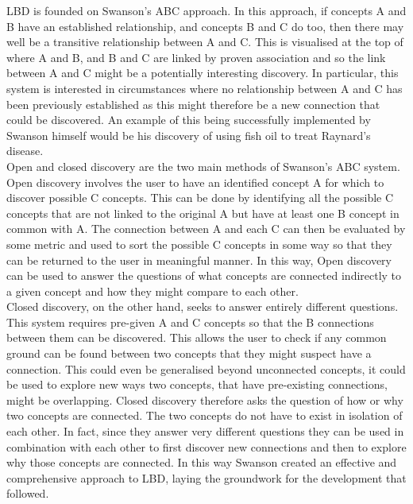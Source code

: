 \documentclass{l4proj}
\begin{document}
LBD is founded on Swanson's ABC approach. In this approach, if concepts A and B have an established relationship, and concepts B and C do too, then there may well be a transitive relationship between A and C. This is visualised at the top of  where A and B, and B and C are linked by proven association and so the link between A and C might be a potentially interesting discovery. In particular, this system is interested in circumstances where no relationship between A and C has been previously established as this might therefore be a new connection that could be discovered. An example of this being successfully implemented by Swanson himself would be his discovery of using fish oil to treat Raynard's disease. \\

Open and closed discovery are the two main methods of Swanson's ABC system. Open discovery involves the user to have an identified concept A for which to discover possible C concepts. This can be done by identifying all the possible C concepts that are not linked to the original A but have at least one B concept in common with A. The connection between A and each C can then be evaluated by some metric and used to sort the possible C concepts in some way so that they can be returned to the user in meaningful manner. In this way, Open discovery can be used to answer the questions of what concepts are connected indirectly to a given concept and how they might compare to each other. \\

Closed discovery, on the other hand, seeks to answer entirely different questions. This system requires pre-given A and C concepts so that the B connections between them can be discovered. This allows the user to check if any common ground can be found between two concepts that they might suspect have a connection. This could even be generalised beyond unconnected concepts, it could be used to explore new ways two concepts, that have pre-existing connections, might be overlapping. Closed discovery therefore asks the question of how or why two concepts are connected. The two concepts do not have to exist in isolation of each other. In fact, since they answer very different questions they can be used in combination with each other to first discover new connections and then to explore why those concepts are connected. In this way Swanson created an effective and comprehensive approach to LBD, laying the groundwork for the development that followed. \\ 
\end{document}
